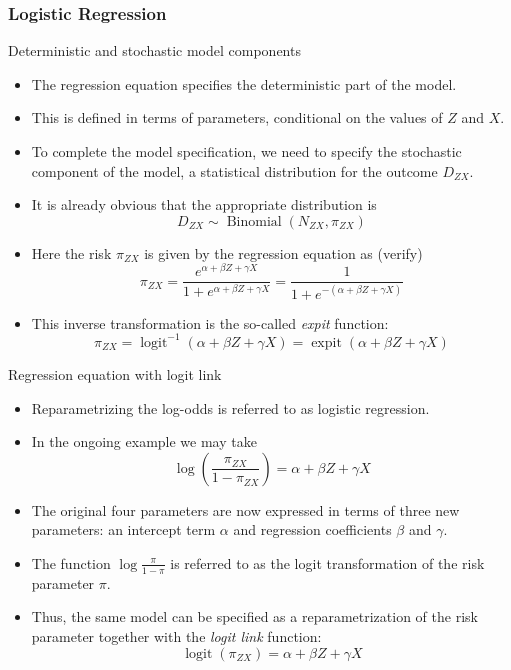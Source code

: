 \documentclass[10pt,handout]{beamer}\usepackage[]{graphicx}\usepackage[]{color}
\begin{document}
\subsubsection{Logistic Regression}

\begin{frame}{Deterministic and stochastic model components}
	\begin{itemize}
		\item 
		The regression equation specifies the deterministic part of the model.
		
		\item This is defined in terms of parameters, conditional on the values of $Z$ and $X$.
		
		\item To complete the model specification, we need to specify the stochastic component of the model, a statistical distribution for the outcome $D_{Z X}$. 
		\item It is already obvious that the appropriate distribution is
		$$
		D_{Z X} \sim \operatorname{Binomial}\left(N_{Z X}, \pi_{Z X}\right)
		$$
		\item Here the risk $\pi_{Z X}$ is given by the regression equation as (verify)
		$$
		\pi_{Z X}=\frac{e^{\alpha+\beta Z+\gamma X}}{1+e^{\alpha+\beta Z+\gamma X}}=\frac{1}{1+e^{-(\alpha+\beta Z+\gamma X)}}
		$$
		\item This inverse transformation is the so-called \textit{expit} function:
		$$
		\pi_{Z X}=\operatorname{logit}^{-1}(\alpha+\beta Z+\gamma X)=\operatorname{expit}(\alpha+\beta Z+\gamma X)
		$$
	\end{itemize}
\end{frame}

\begin{frame}{Regression equation with logit link}
	\begin{itemize}
		\item Reparametrizing the log-odds is referred to as logistic regression.
		\item In the ongoing example we may take
		$$
		\log \left(\frac{\pi_{Z X}}{1-\pi_{Z X}}\right)=\alpha+\beta Z+\gamma X
		$$
		\item The original four parameters are now expressed in terms of three new parameters: an intercept term $\alpha$ and regression coefficients $\beta$ and $\gamma$.
		\item The function $\log \frac{\pi}{1-\pi}$ is referred to as the logit transformation of the risk parameter $\pi$.
		\item Thus, the same model can be specified as a reparametrization of the risk parameter together with the \textit{logit link} function:
		$$
		\operatorname{logit}\left(\pi_{Z X}\right)=\alpha+\beta Z+\gamma X
		$$
	\end{itemize}
\end{frame}
\end{document}
